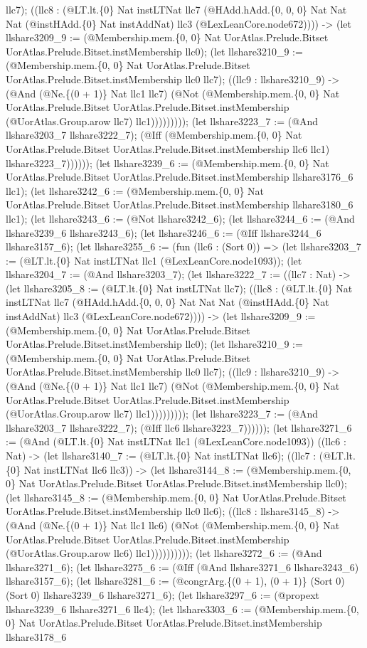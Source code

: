 \documentclass[11pt]{article}
\begin{document}
llc7); ((llc8 : (@LT.lt.\{0\} Nat instLTNat llc7 (@HAdd.hAdd.\{0, 0, 0\} Nat Nat Nat (@instHAdd.\{0\} Nat instAddNat) llc3 (@LexLeanCore.node672)))) -> (let llshare3209\_9 := (@Membership.mem.\{0, 0\} Nat UorAtlas.Prelude.Bitset UorAtlas.Prelude.Bitset.instMembership llc0); (let llshare3210\_9 := (@Membership.mem.\{0, 0\} Nat UorAtlas.Prelude.Bitset UorAtlas.Prelude.Bitset.instMembership llc0 llc7); ((llc9 : llshare3210\_9) -> (@And (@Ne.\{(0 + 1)\} Nat llc1 llc7) (@Not (@Membership.mem.\{0, 0\} Nat UorAtlas.Prelude.Bitset UorAtlas.Prelude.Bitset.instMembership (@UorAtlas.Group.arow llc7) llc1))))))))); (let llshare3223\_7 := (@And llshare3203\_7 llshare3222\_7); (@Iff (@Membership.mem.\{0, 0\} Nat UorAtlas.Prelude.Bitset UorAtlas.Prelude.Bitset.instMembership llc6 llc1) llshare3223\_7)))))); (let llshare3239\_6 := (@Membership.mem.\{0, 0\} Nat UorAtlas.Prelude.Bitset UorAtlas.Prelude.Bitset.instMembership llshare3176\_6 llc1); (let llshare3242\_6 := (@Membership.mem.\{0, 0\} Nat UorAtlas.Prelude.Bitset UorAtlas.Prelude.Bitset.instMembership llshare3180\_6 llc1); (let llshare3243\_6 := (@Not llshare3242\_6); (let llshare3244\_6 := (@And llshare3239\_6 llshare3243\_6); (let llshare3246\_6 := (@Iff llshare3244\_6 llshare3157\_6); (let llshare3255\_6 := (fun (llc6 : (Sort 0)) => (let llshare3203\_7 := (@LT.lt.\{0\} Nat instLTNat llc1 (@LexLeanCore.node1093)); (let llshare3204\_7 := (@And llshare3203\_7); (let llshare3222\_7 := ((llc7 : Nat) -> (let llshare3205\_8 := (@LT.lt.\{0\} Nat instLTNat llc7); ((llc8 : (@LT.lt.\{0\} Nat instLTNat llc7 (@HAdd.hAdd.\{0, 0, 0\} Nat Nat Nat (@instHAdd.\{0\} Nat instAddNat) llc3 (@LexLeanCore.node672)))) -> (let llshare3209\_9 := (@Membership.mem.\{0, 0\} Nat UorAtlas.Prelude.Bitset UorAtlas.Prelude.Bitset.instMembership llc0); (let llshare3210\_9 := (@Membership.mem.\{0, 0\} Nat UorAtlas.Prelude.Bitset UorAtlas.Prelude.Bitset.instMembership llc0 llc7); ((llc9 : llshare3210\_9) -> (@And (@Ne.\{(0 + 1)\} Nat llc1 llc7) (@Not (@Membership.mem.\{0, 0\} Nat UorAtlas.Prelude.Bitset UorAtlas.Prelude.Bitset.instMembership (@UorAtlas.Group.arow llc7) llc1))))))))); (let llshare3223\_7 := (@And llshare3203\_7 llshare3222\_7); (@Iff llc6 llshare3223\_7)))))); (let llshare3271\_6 := (@And (@LT.lt.\{0\} Nat instLTNat llc1 (@LexLeanCore.node1093)) ((llc6 : Nat) -> (let llshare3140\_7 := (@LT.lt.\{0\} Nat instLTNat llc6); ((llc7 : (@LT.lt.\{0\} Nat instLTNat llc6 llc3)) -> (let llshare3144\_8 := (@Membership.mem.\{0, 0\} Nat UorAtlas.Prelude.Bitset UorAtlas.Prelude.Bitset.instMembership llc0); (let llshare3145\_8 := (@Membership.mem.\{0, 0\} Nat UorAtlas.Prelude.Bitset UorAtlas.Prelude.Bitset.instMembership llc0 llc6); ((llc8 : llshare3145\_8) -> (@And (@Ne.\{(0 + 1)\} Nat llc1 llc6) (@Not (@Membership.mem.\{0, 0\} Nat UorAtlas.Prelude.Bitset UorAtlas.Prelude.Bitset.instMembership (@UorAtlas.Group.arow llc6) llc1)))))))))); (let llshare3272\_6 := (@And llshare3271\_6); (let llshare3275\_6 := (@Iff (@And llshare3271\_6 llshare3243\_6) llshare3157\_6); (let llshare3281\_6 := (@congrArg.\{(0 + 1), (0 + 1)\} (Sort 0) (Sort 0) llshare3239\_6 llshare3271\_6); (let llshare3297\_6 := (@propext llshare3239\_6 llshare3271\_6 llc4); (let llshare3303\_6 := (@Membership.mem.\{0, 0\} Nat UorAtlas.Prelude.Bitset UorAtlas.Prelude.Bitset.instMembership llshare3178\_6 
\end{document}
